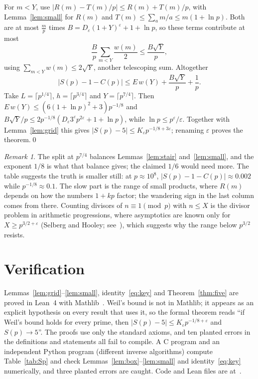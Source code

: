 \documentclass[11pt]{amsart}
\theoremstyle{remark}
\newtheorem{remark}[theorem]{Remark}
\begin{document}
For $m<Y$, use $|R(m)-T(m)/p|\le R(m)+T(m)/p$, with Lemma~\ref{lem:small} for $R(m)$ and $T(m)\le\sum_a m/a\le m(1+\ln p)$. Both are at most $\frac mp$ times $B=D_\varepsilon(1+Y)^\varepsilon+1+\ln p$, so these terms contribute at most
\[
\frac Bp\sum_{m<Y}\frac{w(m)}2\le\frac{B\sqrt Y}p,
\]
using $\sum_{m<Y}w(m)\le2\sqrt Y$, another telescoping sum. Altogether
\[
\bigl|S(p)-1-C(p)\bigr|\le E\,w(Y)+\frac{B\sqrt Y}p+\frac1p .
\]
Take $L=\lceil p^{1/4}\rceil$, $h=\lceil p^{3/4}\rceil$ and $Y=\lceil p^{7/4}\rceil$. Then $E\,w(Y)\le(6(1+\ln p)^2+3)p^{-1/8}$ and $B\sqrt Y/p\le2p^{-1/8}(D_\varepsilon3^{\varepsilon}p^{2\varepsilon}+1+\ln p)$, while $\ln p\le p^{\varepsilon}/\varepsilon$. Together with Lemma~\ref{lem:grid} this gives $|S(p)-5|\le K_\varepsilon p^{-1/8+3\varepsilon}$; renaming $\varepsilon$ proves the theorem.\qed

\begin{remark}
The split at $p^{7/4}$ balances Lemmas~\ref{lem:stair} and~\ref{lem:small}, and the exponent $1/8$ is what that balance gives; the claimed $1/6$ would need more. The table suggests the truth is smaller still: at $p\approx10^8$, $|S(p)-1-C(p)|\approx0.002$ while $p^{-1/8}\approx0.1$. The slow part is the range of small products, where $R(m)$ depends on how the numbers $1+kp$ factor; the wandering sign in the last column comes from there. Counting divisors of $n\equiv1\pmod p$ with $n\le X$ is the divisor problem in arithmetic progressions, where asymptotics are known only for $X\ge p^{3/2+\varepsilon}$ (Selberg and Hooley; see~\cite{Shp}), which suggests why the range below $p^{3/2}$ resists.
\end{remark}

\section{Verification}

Lemmas~\ref{lem:grid}--\ref{lem:small}, identity~\eqref{eq:key} and Theorem~\ref{thm:five} are proved in Lean~4 with Mathlib~\cite{mathlib}. Weil's bound is not in Mathlib; it appears as an explicit hypothesis on every result that uses it, so the formal theorem reads ``if Weil's bound holds for every prime, then $|S(p)-5|\le K_\varepsilon p^{-1/8+\varepsilon}$ and $S(p)\to5$''. The proofs use only the standard axioms, and ten planted errors in the definitions and statements all fail to compile. A C program and an independent Python program (different inverse algorithms) compute Table~\ref{tab:Sp} and check Lemmas~\ref{lem:box}--\ref{lem:small} and identity~\eqref{eq:key} numerically, and three planted errors are caught. Code and Lean files are at~\cite{repo}.
\end{document}
